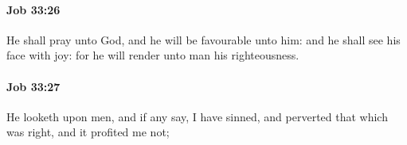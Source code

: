 		\paragraph{Job 33:26} %
			\label{JOB-33-26}

			He shall pray unto God, and he will be favourable unto him: and he shall see his face with joy: for he will render unto man his righteousness.


		\paragraph{Job 33:27} %
			\label{JOB-33-27}

			He looketh upon men, and if any say, I have sinned, and perverted that which was right, and it profited me not;


